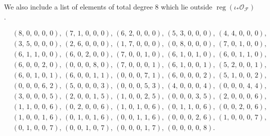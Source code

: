 \documentclass[12pt,reqno]{amsart}
\theoremstyle{definition}
\theoremstyle{remark}
\newcommand{\reg}{\operatorname{reg}}
\newcommand{\calF}{{\mathcal{F}}}
\newcommand{\calO}{{\mathcal{O}}}
\begin{document}
\newpage
We also include a list of elements of total degree 8 which lie outside $\reg(\iota_*\calO_{\calF})$.

\begin{align*}
    &\left(8,\,0,\,0,\,0,\,0\right),\,\left(7,\,1,\,0,\,0,\,0\right),\,\left(6,\,2,\,0,\,0,\,0\right),\,\left(5,\,3,\,0,\,0,\,0\right),\,\left(4,\,4,\,0,\,0,\,0\right),\\
&\left(3,\,5,\,0,\,0,\,0\right),\,\left(2,\,6,\,0,\,0,\,0\right),\,\left(1,\,7,\,0,\,0,\,0\right),\,\left(0,\,8,\,0,\,0,\,0\right),\,\left(7,\,0,\,1,\,0,\,0\right),\\
&\left(6,\,1,\,1,\,0,\,0\right),\,\left(6,\,0,\,2,\,0,\,0\right),\,\left(7,\,0,\,0,\,1,\,0\right),\,\left(6,\,1,\,0,\,1,\,0\right),\,\left(6,\,0,\,1,\,1,\,0\right),\\
&\left(6,\,0,\,0,\,2,\,0\right),\,\left(0,\,0,\,0,\,8,\,0\right),\,\left(7,\,0,\,0,\,0,\,1\right),\,\left(6,\,1,\,0,\,0,\,1\right),\,\left(5,\,2,\,0,\,0,\,1\right),\\
&\left(6,\,0,\,1,\,0,\,1\right),\,\left(6,\,0,\,0,\,1,\,1\right),\,\left(0,\,0,\,0,\,7,\,1\right),\,\left(6,\,0,\,0,\,0,\,2\right),\,\left(5,\,1,\,0,\,0,\,2\right),\\
&\left(0,\,0,\,0,\,6,\,2\right),\,\left(5,\,0,\,0,\,0,\,3\right),\,\left(0,\,0,\,0,\,5,\,3\right),\,\left(4,\,0,\,0,\,0,\,4\right),\,\left(0,\,0,\,0,\,4,\,4\right),\\
&\left(3,\,0,\,0,\,0,\,5\right),\,\left(2,\,0,\,0,\,1,\,5\right),\,\left(1,\,0,\,0,\,2,\,5\right),\,\left(0,\,0,\,0,\,3,\,5\right),\,\left(2,\,0,\,0,\,0,\,6\right),\\
&\left(1,\,1,\,0,\,0,\,6\right),\,\left(0,\,2,\,0,\,0,\,6\right),\,\left(1,\,0,\,1,\,0,\,6\right),\,\left(0,\,1,\,1,\,0,\,6\right),\,\left(0,\,0,\,2,\,0,\,6\right),\\
&\left(1,\,0,\,0,\,1,\,6\right),\,\left(0,\,1,\,0,\,1,\,6\right),\,\left(0,\,0,\,1,\,1,\,6\right),\,\left(0,\,0,\,0,\,2,\,6\right),\,\left(1,\,0,\,0,\,0,\,7\right),\\
&\left(0,\,1,\,0,\,0,\,7\right),\,\left(0,\,0,\,1,\,0,\,7\right),\,\left(0,\,0,\,0,\,1,\,7\right),\,\left(0,\,0,\,0,\,0,\,8\right).
\end{align*}
\end{document}
